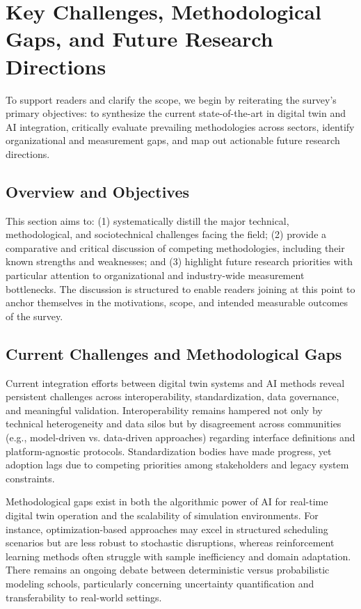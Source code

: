 \documentclass[sigconf]{acmart}
\begin{document}
\section{Key Challenges, Methodological Gaps, and Future Research Directions}

To support readers and clarify the scope, we begin by reiterating the survey's primary objectives: to synthesize the current state-of-the-art in digital twin and AI integration, critically evaluate prevailing methodologies across sectors, identify organizational and measurement gaps, and map out actionable future research directions.

\subsection{Overview and Objectives}

This section aims to: (1) systematically distill the major technical, methodological, and sociotechnical challenges facing the field; (2) provide a comparative and critical discussion of competing methodologies, including their known strengths and weaknesses; and (3) highlight future research priorities with particular attention to organizational and industry-wide measurement bottlenecks. The discussion is structured to enable readers joining at this point to anchor themselves in the motivations, scope, and intended measurable outcomes of the survey.

\subsection{Current Challenges and Methodological Gaps}

Current integration efforts between digital twin systems and AI methods reveal persistent challenges across interoperability, standardization, data governance, and meaningful validation. Interoperability remains hampered not only by technical heterogeneity and data silos but by disagreement across communities (e.g., model-driven vs. data-driven approaches) regarding interface definitions and platform-agnostic protocols. Standardization bodies have made progress, yet adoption lags due to competing priorities among stakeholders and legacy system constraints.

Methodological gaps exist in both the algorithmic power of AI for real-time digital twin operation and the scalability of simulation environments. For instance, optimization-based approaches may excel in structured scheduling scenarios but are less robust to stochastic disruptions, whereas reinforcement learning methods often struggle with sample inefficiency and domain adaptation. There remains an ongoing debate between deterministic versus probabilistic modeling schools, particularly concerning uncertainty quantification and transferability to real-world settings.
\end{document}
